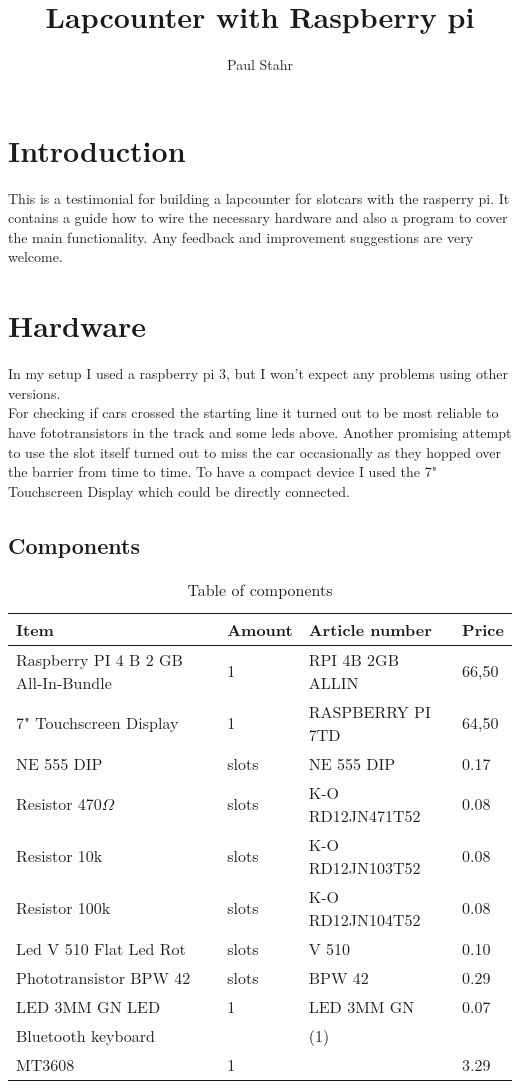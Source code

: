 \documentclass[11pt, a4paper, UKenglish, parskip=half+, oneside]{scrbook}
\author{Paul Stahr}
\title{Lapcounter with Raspberry pi}
\newcommand{\slots}{slots}
\begin{document}
\maketitle
\chapter{Introduction}
This is a testimonial for building a lapcounter for slotcars with the rasperry pi. It contains a guide how to wire the necessary hardware and also a program to cover the main functionality. Any feedback and improvement suggestions are very welcome.
\chapter{Hardware}
In my setup I used a raspberry pi 3, but I won't expect any problems using other versions.\\
For checking if cars crossed the starting line it turned out to be most reliable to have fototransistors in the track and some leds above. Another promising attempt to use the slot itself turned out to miss the car occasionally as they hopped over the barrier from time to time. To have a compact device I used the 7" Touchscreen Display which could be directly connected.
\section{Components}
\begin{table}[H]
\begin{tabular}{l l l l}
Item& Amount & Article number & Price\\\hline
Raspberry PI 4 B 2 GB All-In-Bundle & 1 &RPI 4B 2GB ALLIN &66,50 \\
7" Touchscreen Display & 1 & RASPBERRY PI 7TD&64,50\\
NE 555 DIP & \slots &NE 555 DIP& 0.17 \\
Resistor 470$\Omega$ & \slots&K-O RD12JN471T52&0.08 \\
Resistor 10k & \slots& K-O RD12JN103T52 & 0.08\\
Resistor 100k & \slots& K-O RD12JN104T52& 0.08 \\
Led V 510 Flat Led Rot& \slots &V 510& 0.10 \\
Phototransistor BPW 42 & \slots& BPW 42& 0.29\\
LED 3MM GN LED & 1& LED 3MM GN& 0.07\\
Bluetooth keyboard& & (1) \\
MT3608 & 1& & 3.29\\
\end{tabular}
\caption{Table of components}
\end{table}
\end{document}
